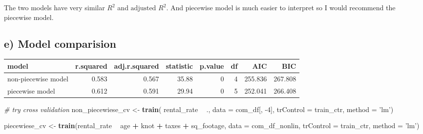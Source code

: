 \documentclass[]{article}
\newenvironment{Shaded}{\begin{snugshade}}{\end{snugshade}}
\newcommand{\CommentTok}[1]{\textcolor[rgb]{0.56,0.35,0.01}{\textit{#1}}}
\newcommand{\DataTypeTok}[1]{\textcolor[rgb]{0.13,0.29,0.53}{#1}}
\newcommand{\DecValTok}[1]{\textcolor[rgb]{0.00,0.00,0.81}{#1}}
\newcommand{\KeywordTok}[1]{\textcolor[rgb]{0.13,0.29,0.53}{\textbf{#1}}}
\newcommand{\NormalTok}[1]{#1}
\newcommand{\OperatorTok}[1]{\textcolor[rgb]{0.81,0.36,0.00}{\textbf{#1}}}
\newcommand{\StringTok}[1]{\textcolor[rgb]{0.31,0.60,0.02}{#1}}
\begin{document}
The two models have very similar \(R^2\) and \(\text{adjusted } R^2\).
And piecewise model is much easier to interpret so I would recommend the
piecewise model.

\hypertarget{e-model-comparision}{%
\subsection{e) Model comparision}\label{e-model-comparision}}

\begin{Shaded}
\end{Shaded}

\begin{tabular}{l|r|r|r|r|r|r|r}
\hline
model & r.squared & adj.r.squared & statistic & p.value & df & AIC & BIC\\
\hline
non-piecewise model & 0.583 & 0.567 & 35.88 & 0 & 4 & 255.836 & 267.808\\
\hline
piecewise model & 0.612 & 0.591 & 29.94 & 0 & 5 & 252.041 & 266.408\\
\hline
\end{tabular}

\begin{Shaded}
\begin{Highlighting}[]
\CommentTok{# try cross validation}
\NormalTok{non_piecewiese_cv <-}\StringTok{ }
\StringTok{    }\KeywordTok{train}\NormalTok{( rental_rate }\OperatorTok{~}\StringTok{ }\NormalTok{., }\DataTypeTok{data =}\NormalTok{ com_df[, }\DecValTok{-4}\NormalTok{],}
           \DataTypeTok{trControl =}\NormalTok{ train_ctr,}
           \DataTypeTok{method =} \StringTok{'lm'}\NormalTok{)}

\NormalTok{piecewiese_cv <-}\StringTok{     }
\StringTok{    }\KeywordTok{train}\NormalTok{(rental_rate }\OperatorTok{~}\StringTok{ }\NormalTok{age }\OperatorTok{+}\StringTok{ }\NormalTok{knot }\OperatorTok{+}\StringTok{ }\NormalTok{taxes }\OperatorTok{+}\StringTok{ }\NormalTok{sq_footage, }\DataTypeTok{data =}\NormalTok{ com_df_nonlin,}
          \DataTypeTok{trControl =}\NormalTok{ train_ctr,}
          \DataTypeTok{method =} \StringTok{'lm'}\NormalTok{)}
\end{Highlighting}
\end{Shaded}
\end{document}
